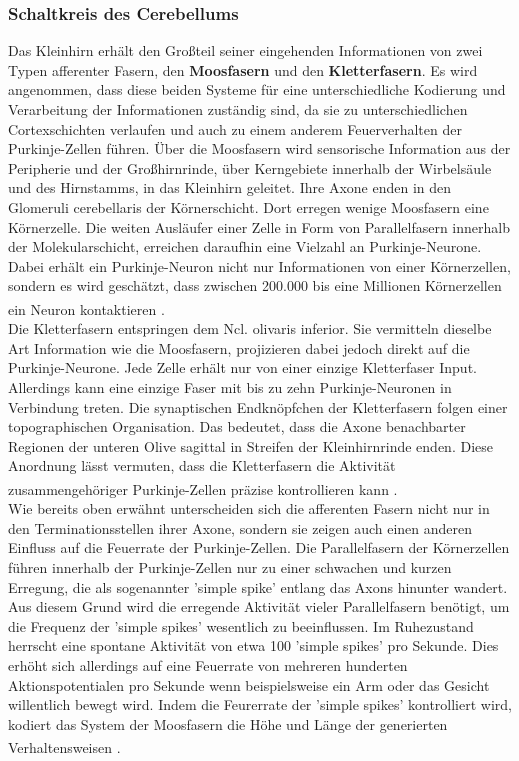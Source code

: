 \documentclass[12pt,a4paper,pdftex]{article}
\begin{document}
\subsubsection{Schaltkreis des Cerebellums} \label{subsubsec:kleinhirn_schaltkreis}
Das Kleinhirn erhält den Großteil seiner eingehenden Informationen von zwei Typen afferenter Fasern, den \textbf{Moosfasern} und den \textbf{Kletterfasern}. Es wird angenommen, dass diese beiden Systeme für eine unterschiedliche Kodierung und Verarbeitung der Informationen zuständig sind, da sie zu unterschiedlichen Cortexschichten verlaufen und auch zu einem anderem Feuerverhalten der Purkinje-Zellen führen. Über die Moosfasern wird sensorische Information aus der Peripherie und der Großhirnrinde, über Kerngebiete innerhalb der Wirbelsäule und des Hirnstamms, in das Kleinhirn geleitet. Ihre Axone enden in den Glomeruli cerebellaris der Körnerschicht. Dort erregen wenige Moosfasern eine Körnerzelle. Die weiten Ausläufer einer Zelle in Form von Parallelfasern innerhalb der Molekularschicht, erreichen daraufhin eine Vielzahl an Purkinje-Neurone. Dabei erhält ein Purkinje-Neuron nicht nur Informationen von einer Körnerzellen, sondern es wird geschätzt, dass zwischen 200.000 bis eine Millionen Körnerzellen ein Neuron kontaktieren \textsuperscript{\cite[42]{kandel2013principles}}.\\  
Die Kletterfasern entspringen dem Ncl. olivaris inferior. Sie vermitteln dieselbe Art Information wie die Moosfasern, projizieren dabei jedoch direkt auf die Purkinje-Neurone. Jede Zelle erhält nur von einer einzige Kletterfaser Input. Allerdings kann eine einzige Faser mit bis zu zehn Purkinje-Neuronen in Verbindung treten. Die synaptischen Endknöpfchen der Kletterfasern folgen einer topographischen Organisation. Das bedeutet, dass die Axone benachbarter Regionen der unteren Olive sagittal in Streifen der Kleinhirnrinde enden. Diese Anordnung lässt vermuten, dass die Kletterfasern die Aktivität zusammengehöriger Purkinje-Zellen präzise kontrollieren kann \textsuperscript{\cite[42]{kandel2013principles}}.\\         
Wie bereits oben erwähnt unterscheiden sich die afferenten Fasern nicht nur in den Terminationsstellen ihrer Axone, sondern sie zeigen auch einen anderen Einfluss auf die Feuerrate der Purkinje-Zellen. Die Parallelfasern der Körnerzellen führen innerhalb der Purkinje-Zellen nur zu einer schwachen und kurzen Erregung, die als sogenannter 'simple spike' entlang das Axons hinunter wandert. Aus diesem Grund wird die erregende Aktivität vieler Parallelfasern benötigt, um die Frequenz der 'simple spikes' wesentlich zu beeinflussen. Im Ruhezustand herrscht eine spontane Aktivität von etwa 100 'simple spikes' pro Sekunde. Dies erhöht sich allerdings auf eine Feuerrate von mehreren hunderten Aktionspotentialen pro Sekunde wenn beispielsweise ein Arm oder das Gesicht willentlich bewegt wird. Indem die Feurerrate der 'simple spikes' kontrolliert wird, kodiert das System der Moosfasern die Höhe und Länge der generierten Verhaltensweisen \textsuperscript{\cite[42]{kandel2013principles}}.\\   
\end{document}

